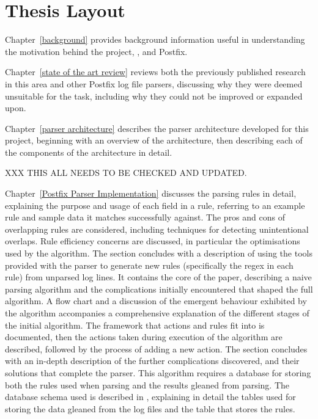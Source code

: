 \section{Thesis Layout}

Chapter~\ref{background} provides background information useful in
understanding the motivation behind the project, , and
Postfix.

Chapter~\ref{state of the art review} reviews both the previously published
research in this area and other Postfix log file parsers, discussing why
they were deemed unsuitable for the task, including why they could not be
improved or expanded upon.

Chapter~\ref{parser architecture} describes the parser architecture
developed for this project, beginning with an overview of the architecture,
then describing each of the components of the architecture in detail.

XXX THIS ALL NEEDS TO BE CHECKED AND UPDATED\@.

Chapter~\ref{Postfix Parser Implementation} discusses the parsing rules in
detail, explaining the purpose and usage of each field in a rule, referring
to an example rule and sample data it matches successfully against.  The
pros and cons of overlapping rules are considered, including techniques for
detecting unintentional overlaps.  Rule efficiency concerns are discussed,
in particular the optimisations used by the algorithm.  The section
concludes with a description of using the tools provided with the parser to
generate new rules (specifically the regex in each rule) from unparsed log
lines.  It contains the core of the paper, describing a naive parsing
algorithm and the complications initially encountered that shaped the full
algorithm.  A flow chart and a discussion of the emergent behaviour
exhibited by the algorithm accompanies a comprehensive explanation of the
different stages of the initial algorithm.  The framework that actions and
rules fit into is documented, then the actions taken during execution of
the algorithm are described, followed by the process of adding a new
action.  The section concludes with an in-depth description of the further
complications discovered, and their solutions that complete the parser.
This algorithm requires a database for storing both the rules used when
parsing and the results gleaned from parsing.  The database schema used is
described in , explaining in detail the tables used
for storing the data gleaned from the log files and the table that stores
the rules.

